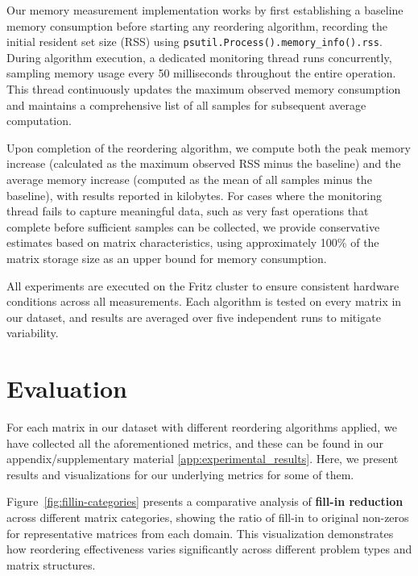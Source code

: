 Our memory measurement implementation works by first establishing a baseline memory consumption before starting any reordering algorithm, recording the initial resident set size (RSS) using \texttt{psutil.Process().memory\_info().rss}. During algorithm execution, a dedicated monitoring thread runs concurrently, sampling memory usage every 50 milliseconds throughout the entire operation. This thread continuously updates the maximum observed memory consumption and maintains a comprehensive list of all samples for subsequent average computation.

Upon completion of the reordering algorithm, we compute both the peak memory increase (calculated as the maximum observed RSS minus the baseline) and the average memory increase (computed as the mean of all samples minus the baseline), with results reported in kilobytes. For cases where the monitoring thread fails to capture meaningful data, such as very fast operations that complete before sufficient samples can be collected, we provide conservative estimates based on matrix characteristics, using approximately 100\% of the matrix storage size as an upper bound for memory consumption.

All experiments are executed on the Fritz cluster to ensure consistent hardware conditions across all measurements. Each algorithm is tested on every matrix in our dataset, and results are averaged over five independent runs to mitigate variability. 

\section{Evaluation}

For each matrix in our dataset with different reordering algorithms applied, we have collected all the aforementioned metrics, and these can be found in our appendix/supplementary material \ref{app:experimental_results}. Here, we present results and visualizations for our underlying metrics for some of them.

Figure~\ref{fig:fillin-categories} presents a comparative analysis of \textbf{fill-in reduction} across different matrix categories, showing the ratio of fill-in to original non-zeros for representative matrices from each domain. This visualization demonstrates how reordering effectiveness varies significantly across different problem types and matrix structures.

